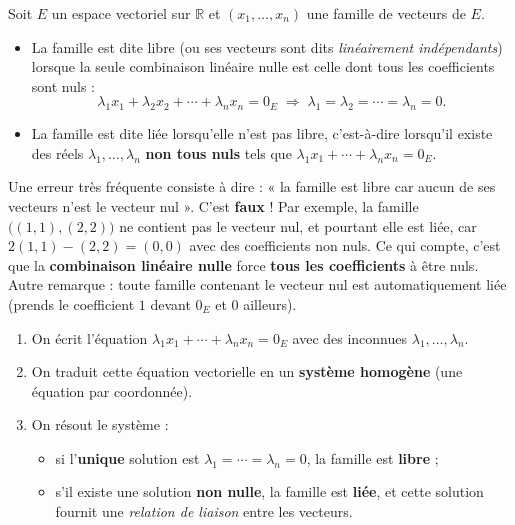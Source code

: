 \documentclass[11pt]{article}
\newcommand{\cle}[1]{{\popxbold\color{popdark}#1}}
\begin{document}
\begin{definition}
Soit $E$ un espace vectoriel sur $\mathbb{R}$ et $(x_1, \ldots, x_n)$ une famille de vecteurs de $E$.
\begin{itemize}
\item La famille est dite \cle{libre} (ou ses vecteurs sont dits \emph{linéairement indépendants}) lorsque la seule combinaison linéaire nulle est celle dont tous les coefficients sont nuls :
\[ \lambda_1 x_1 + \lambda_2 x_2 + \cdots + \lambda_n x_n = 0_E \;\Longrightarrow\; \lambda_1 = \lambda_2 = \cdots = \lambda_n = 0. \]
\item La famille est dite \cle{liée} lorsqu'elle n'est pas libre, c'est-à-dire lorsqu'il existe des réels $\lambda_1, \ldots, \lambda_n$ \textbf{non tous nuls} tels que $\lambda_1 x_1 + \cdots + \lambda_n x_n = 0_E$.
\end{itemize}
\end{definition}

\begin{attention}
Une erreur très fréquente consiste à dire : « la famille est libre car aucun de ses vecteurs n'est le vecteur nul ». C'est \textbf{faux} ! Par exemple, la famille $\big((1,1), (2,2)\big)$ ne contient pas le vecteur nul, et pourtant elle est liée, car $2(1,1) - (2,2) = (0,0)$ avec des coefficients non nuls. Ce qui compte, c'est que la \textbf{combinaison linéaire nulle} force \textbf{tous les coefficients} à être nuls. Autre remarque : toute famille contenant le vecteur nul est automatiquement liée (prends le coefficient $1$ devant $0_E$ et $0$ ailleurs).
\end{attention}

\begin{methode}
\begin{enumerate}
\item On écrit l'équation $\lambda_1 x_1 + \cdots + \lambda_n x_n = 0_E$ avec des inconnues $\lambda_1, \ldots, \lambda_n$.
\item On traduit cette équation vectorielle en un \textbf{système homogène} (une équation par coordonnée).
\item On résout le système :
\begin{itemize}
\item si l'\textbf{unique} solution est $\lambda_1 = \cdots = \lambda_n = 0$, la famille est \textbf{libre} ;
\item s'il existe une solution \textbf{non nulle}, la famille est \textbf{liée}, et cette solution fournit une \emph{relation de liaison} entre les vecteurs.
\end{itemize}
\end{enumerate}
\end{methode}
\end{document}
